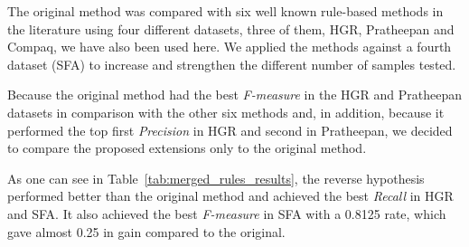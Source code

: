 The original method was compared with six well known rule-based methods in the literature using four different datasets, three of them, HGR, Pratheepan and Compaq, we have also been used here. We applied the methods against a fourth dataset (SFA) to increase and strengthen the different number of samples tested.

Because the original method had the best \textit{F-measure} in the HGR and Pratheepan datasets in comparison with the other six methods and, in addition, because it performed the top first \textit{Precision} in HGR and second in Pratheepan, we decided to compare the proposed extensions only to the original method.

As one can see in Table~\ref{tab:merged_rules_results}, the reverse hypothesis performed better than the original method and achieved the best \textit{Recall} in HGR and SFA. It also achieved the best \textit{F-measure} in SFA with a 0.8125 rate, which gave almost 0.25 in gain compared to the original.

